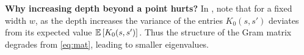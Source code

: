 \begin{appendix}
\textbf{Why increasing depth beyond a point hurts?} 
In , note that for a fixed width $w$, as the depth increases the variance of the entries $K_0(s,s')$ deviates from its expected value $\mathbb{E}\left[K_0(s,s')\right]$. Thus the structure of the Gram matrix degrades from \eqref{eq:mat}, leading to smaller eigenvalues.
\FloatBarrier
\begin{figure}[h]
\end{figure}
\end{appendix}
